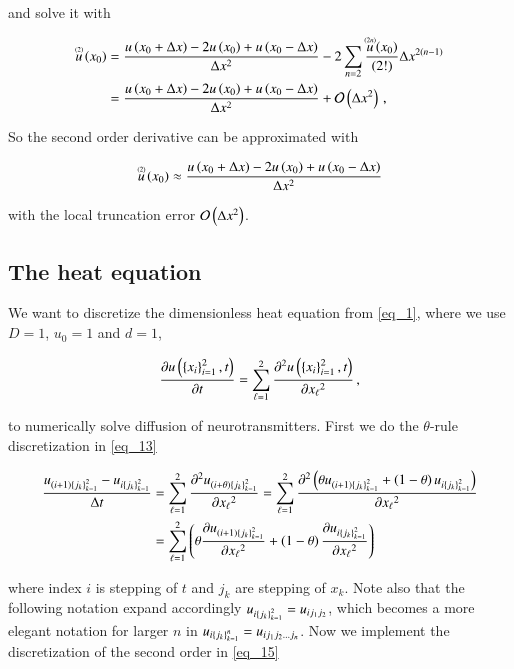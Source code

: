 \documentclass[11pt,english,a4paper]{article}
\begin{document}
\begin{flushleft}
and solve it with

\begin{align*}
\T{u}{(2)}\p{x_0} &= \frac{u\p{x_0+\Delta x} - 2 u\p{x_0} + u\p{x_0-\Delta x}}{\Delta x^2} - 2\sum_{n=2} \frac{\T{u}{(2n)}\p{x_0}}{(2!)}\Delta x^{2(n-1)}
\\ &=  \frac{u\p{x_0+\Delta x} - 2 u\p{x_0} + u\p{x_0-\Delta x}}{\Delta x^2} + \mathcal{O}\p{\Delta x^2}\,,
\end{align*}

So the second order derivative can be approximated with

\begin{align}
\T{u}{(2)}\p{x_0} \approx   \frac{u\p{x_0+\Delta x} - 2 u\p{x_0} + u\p{x_0-\Delta x}}{\Delta x^2}
\label{eq_15}
\end{align}

with the local truncation error $\mathcal{O}\p{\Delta x^2}$.

\subsection{The heat equation} \label{heat_equation}

We want to discretize the dimensionless heat equation from \eqref{eq_1}, where we use $D=1$, $u_0=1$ and $d=1$, 

\begin{align*}
\frac{\partial u\p{\kr{x_i}_{i=1}^2,t}}{\partial t} = \sum_{\ell=1}^2\frac{\partial^2 u\p{\kr{x_i}_{i=1}^2,t}}{\partial {x_\ell}^2}\,,
\end{align*}

to numerically solve diffusion of neurotransmitters. First we do the $\theta$-rule discretization in \eqref{eq_13} 

\begin{align*}
\frac{u_{(i+1)\kr{j_k}_{k=1}^2}-u_{i\kr{j_k}_{k=1}^2}}{\Delta t} 
&= \sum_{\ell = 1}^2\frac{\partial^2 u_{(i+\theta)\kr{j_k}_{k=1}^2}}{\partial {x_\ell}^2} 
= \sum_{\ell=1}^2\frac{\partial^2 \p{\theta u_{(i+1)\kr{j_k}_{k=1}^2}+\p{1-\theta}u_{i\kr{j_k}_{k=1}^2}}}{\partial {x_\ell}^2} 
\\
&= \sum_{\ell=1}^2\p{\theta \frac{\partial u_{(i+1)\kr{j_k}_{k=1}^2}}{\partial {x_\ell}^2} + \p{1-\theta}\frac{\partial u_{i\kr{j_k}_{k=1}^2}}{\partial {x_\ell}^2}}
\end{align*}

where index $i$ is stepping of $t$ and $j_k$ are stepping of $x_k$. Note also that the following notation expand accordingly $u_{i\kr{j_k}_{k=1}^2} = u_{ij_1 j_2}$, which becomes a more elegant notation for larger $n$ in $u_{i\kr{j_k}_{k=1}^n} = u_{ij_1j_2\ldots j_n}$. Now we implement the discretization of the second order in \eqref{eq_15}


\end{flushleft}
\end{document}
